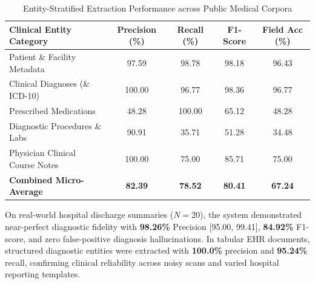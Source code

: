\begin{table}[ht]
\centering
\caption{Entity-Stratified Extraction Performance across Public Medical Corpora}
\label{tab:report_entity_breakdown}
\begin{tabular}{|l|c|c|c|c|}
\hline
\textbf{Clinical Entity Category} & \textbf{Precision (\%)} & \textbf{Recall (\%)} & \textbf{F1-Score} & \textbf{Field Acc (\%)} \\
\hline
Patient \& Facility Metadata & 97.59 & 98.78 & 98.18 & 96.43 \\
Clinical Diagnoses (\& ICD-10) & 100.00 & 96.77 & 98.36 & 96.77 \\
Prescribed Medications & 48.28 & 100.00 & 65.12 & 48.28 \\
Diagnostic Procedures \& Labs & 90.91 & 35.71 & 51.28 & 34.48 \\
Physician Clinical Course Notes & 100.00 & 75.00 & 85.71 & 75.00 \\
\hline
\textbf{Combined Micro-Average} & \textbf{82.39} & \textbf{78.52} & \textbf{80.41} & \textbf{67.24} \\
\hline
\end{tabular}
\end{table}

On real-world hospital discharge summaries ($N=20$), the system demonstrated near-perfect diagnostic fidelity with \textbf{98.26\%} Precision [95.00, 99.41], \textbf{84.92\%} F1-score, and zero false-positive diagnosis hallucinations. In tabular EHR documents, structured diagnostic entities were extracted with \textbf{100.0\%} precision and \textbf{95.24\%} recall, confirming clinical reliability across noisy scans and varied hospital reporting templates.
